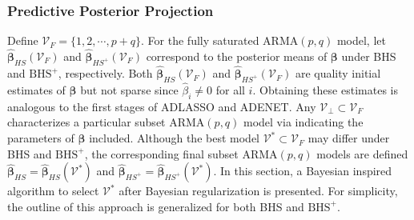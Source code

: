 \subsubsection{Predictive Posterior Projection}

Define $\mathcal{V}_F=\{1,2,\cdots,p+q\}$. For the fully saturated ARMA$(p,q)$ model, let $\hat{\bm{\beta}}_{HS}(\mathcal{V}_F)$ and $\hat{\bm{\beta}}_{HS^{+}}(\mathcal{V}_F)$ correspond to the posterior means of $\bm{\beta}$ under BHS and $\textrm{BHS}^+$, respectively. Both $\hat{\bm{\beta}}_{HS}(\mathcal{V}_F)$ and $\hat{\bm{\beta}}_{HS^{+}}(\mathcal{V}_F)$ are quality initial estimates of $\bm{\beta}$ but not sparse since $\hat{\beta}_i \neq 0$ for all $i$. Obtaining these estimates is analogous to the first stages of ADLASSO and ADENET. Any $\mathcal{V}_\perp \subset \mathcal{V}_F$ characterizes a particular subset ARMA$(p,q)$ model via indicating the parameters of $\bm{\beta}$ included.  Although the best model $\mathcal{V}^* \subset \mathcal{V}_F$ may differ under BHS and $\textrm{BHS}^+$, the corresponding final subset ARMA$(p,q)$ models are defined $\hat{\bm{\beta}}_{HS}=\hat{\bm{\beta}}_{HS}(\mathcal{V}^*)$ and $\hat{\bm{\beta}}_{HS^{+}}=\hat{\bm{\beta}}_{HS^{+}}(\mathcal{V}^*)$. In this section, a Bayesian inspired algorithm to select $\mathcal{V}^*$ after Bayesian regularization is presented. For simplicity, the outline of this approach is generalized for both BHS and $\textrm{BHS}^+$.

